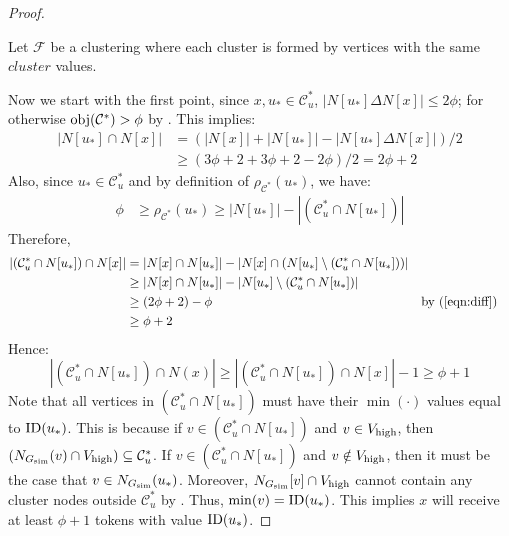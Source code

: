 \begin{proof}
\begin{algorithm}[ht!]
\begin{algorithmic}[1]
    \State Let $\mathcal{F}$ be a clustering where each cluster is formed by vertices with the same $cluster$ values. 
\EndFunction
\end{algorithmic}
\end{algorithm}

Now we start with the first point, since $x, u_{*} \in \mathcal{C}^{*}_u$, $|N[u_{*}] \Delta N[x]| \leq 2\phi$; for otherwise $\mathrm{obj}(\mathcal{C}^{*}) > \phi$ by . This implies:
\begin{align*} 
|N[u_{*}] \cap N[x]| &=  (|N[x]| + |N[u_{*}]| - |N[u_{*}] \Delta N[x]|)/2 \\
&\geq (3\phi + 2  + 3\phi + 2 - 2\phi )/2 = 2\phi + 2
\end{align*}
Also, since $u_{*} \in \mathcal{C}^{*}_{u}$ and by definition of $\rho_{\mathcal{C}^{*}}(u_{*})$, we have: 
\begin{align}
\phi &\geq \rho_{\mathcal{C}^{*}}(u_{*}) \geq |N[u_{*}]| - |(\mathcal{C}^{*}_{u} \cap N[u_{*}])|\label{eqn:diff}
\end{align}
Therefore, 
\begin{align*}
|(\mathcal{C}^{*}_{u} \cap N[u_{*}]) \cap N[x]| &= |N[x] \cap N[u_{*}]| - |N[x] \cap (N[u_{*}] \setminus (\mathcal{C}^{*}_{u} \cap N[u_{*}]))| \\
&\geq |N[x] \cap N[u_{*}]| - |N[u_{*}] \setminus (\mathcal{C}^{*}_{u} \cap N[u_{*}])| \\
&\geq (2\phi + 2) - \phi && \mbox{by (\ref{eqn:diff})}\\
&\geq \phi + 2
\end{align*}
Hence:
$$|(\mathcal{C}^{*}_{u} \cap N[u_{*}]) \cap N(x)| \geq |(\mathcal{C}^{*}_{u} \cap N[u_{*}]) \cap N[x]| - 1 \geq \phi + 1$$
Note that all vertices in $(\mathcal{C}^{*}_{u} \cap N[u_{*}])$ must have their $\min(\cdot)$ values equal to $\operatorname{\text{{\rm ID}}}(u_{*})$. This is because if $v \in (\mathcal{C}^{*}_{u} \cap N[u_{*}])$ and $v \in V_{\operatorname{high}}$, then $(N_{G_{\operatorname{sim}}}(v) \cap V_{\operatorname{high}}) \subseteq \mathcal{C}^{*}_{u}$.  If $v \in (\mathcal{C}^{*}_{u} \cap N[u_{*}])$ and $v \notin V_{\operatorname{high}}$, then it must be the case that $v \in N_{G_{\operatorname{sim}}}(u_{*})$. Moreover, $N_{G_{\operatorname{sim}}}[v] \cap V_{\operatorname{high}}$ cannot contain any cluster nodes outside $\mathcal{C}^{*}_{u}$ by . Thus, $\min(v) = \operatorname{\text{{\rm ID}}}(u_{*})$.  This implies $x$ will receive at least $\phi + 1$ tokens with value $\operatorname{\text{{\rm ID}}}(u_{*})$.


\end{proof}
